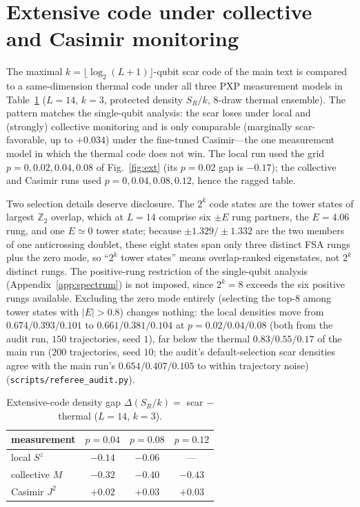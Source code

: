 \documentclass[a4paper,11pt,twocolumn,unpublished]{quantumarticle}
\newcommand{\Ztwo}{\mathbb{Z}_2}
\begin{document}
\section{Extensive code under collective and Casimir monitoring}
\label{app:extensive}

The maximal $k=\lfloor\log_2(L{+}1)\rfloor$-qubit scar code of the main text is
compared to a same-dimension thermal code under all three PXP measurement models
in Table~\ref{tab:ext} ($L=14$, $k=3$, protected density $S_R/k$, $8$-draw
thermal ensemble). The pattern matches the single-qubit analysis: the scar loses
under local and (strongly) collective monitoring and is only comparable
(marginally scar-favorable, up to $+0.034$) under the fine-tuned
Casimir---the one measurement model in which the thermal code does not win.
The local run used the grid $p=0,0.02,0.04,0.08$ of Fig.~\ref{fig:ext} (its
$p=0.02$ gap is $-0.17$); the collective and Casimir runs used
$p=0,0.04,0.08,0.12$, hence the ragged table.

Two selection details deserve disclosure. The $2^k$ code states are the
tower states of largest $\Ztwo$ overlap, which at $L=14$ comprise six
$\pm E$ rung partners, the $E=4.06$ rung, and one $E\simeq0$ tower state;
because $\pm1.329/\pm1.332$ are the two members of one anticrossing doublet,
these eight states span only three distinct FSA rungs plus the zero mode,
so ``$2^k$ tower states'' means overlap-ranked eigenstates, not $2^k$
distinct rungs. The positive-rung restriction of the single-qubit analysis
(Appendix~\ref{app:spectrum}) is not imposed, since $2^k=8$ exceeds the six
positive rungs available. Excluding the zero mode entirely (selecting the
top-$8$ among tower states with $|E|>0.8$) changes nothing: the local
densities move from $0.674/0.393/0.101$ to $0.661/0.381/0.104$ at
$p=0.02/0.04/0.08$ (both from the audit run, $150$ trajectories, seed $1$),
far below the thermal $0.83/0.55/0.17$ of the main run ($200$ trajectories,
seed $10$; the audit's default-selection scar densities agree with the main
run's $0.654/0.407/0.105$ to within trajectory noise)
(\texttt{scripts/referee\_audit.py}).

\begin{table}[h]
\caption{Extensive-code density gap $\Delta(S_R/k)=$ scar $-$ thermal ($L=14$,
$k=3$).}
\label{tab:ext}
\centering
\begin{tabular}{lccc}
\toprule
measurement & $p{=}0.04$ & $p{=}0.08$ & $p{=}0.12$ \\
\midrule
local $S^z$    & $-0.14$ & $-0.06$ & --- \\
collective $M$ & $-0.32$ & $-0.40$ & $-0.43$ \\
Casimir $J^2$  & $+0.02$ & $+0.03$ & $+0.03$ \\
\bottomrule
\end{tabular}
\end{table}



\end{document}
